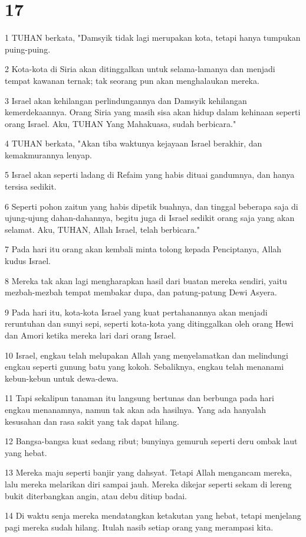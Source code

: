 \chapter{17}

\par 1 TUHAN berkata, "Damsyik tidak lagi merupakan kota, tetapi hanya tumpukan puing-puing.
\par 2 Kota-kota di Siria akan ditinggalkan untuk selama-lamanya dan menjadi tempat kawanan ternak; tak seorang pun akan menghalaukan mereka.
\par 3 Israel akan kehilangan perlindungannya dan Damsyik kehilangan kemerdekaannya. Orang Siria yang masih sisa akan hidup dalam kehinaan seperti orang Israel. Aku, TUHAN Yang Mahakuasa, sudah berbicara."
\par 4 TUHAN berkata, "Akan tiba waktunya kejayaan Israel berakhir, dan kemakmurannya lenyap.
\par 5 Israel akan seperti ladang di Refaim yang habis dituai gandumnya, dan hanya tersisa sedikit.
\par 6 Seperti pohon zaitun yang habis dipetik buahnya, dan tinggal beberapa saja di ujung-ujung dahan-dahannya, begitu juga di Israel sedikit orang saja yang akan selamat. Aku, TUHAN, Allah Israel, telah berbicara."
\par 7 Pada hari itu orang akan kembali minta tolong kepada Penciptanya, Allah kudus Israel.
\par 8 Mereka tak akan lagi mengharapkan hasil dari buatan mereka sendiri, yaitu mezbah-mezbah tempat membakar dupa, dan patung-patung Dewi Asyera.
\par 9 Pada hari itu, kota-kota Israel yang kuat pertahanannya akan menjadi reruntuhan dan sunyi sepi, seperti kota-kota yang ditinggalkan oleh orang Hewi dan Amori ketika mereka lari dari orang Israel.
\par 10 Israel, engkau telah melupakan Allah yang menyelamatkan dan melindungi engkau seperti gunung batu yang kokoh. Sebaliknya, engkau telah menanami kebun-kebun untuk dewa-dewa.
\par 11 Tapi sekalipun tanaman itu langsung bertunas dan berbunga pada hari engkau menanamnya, namun tak akan ada hasilnya. Yang ada hanyalah kesusahan dan rasa sakit yang tak dapat hilang.
\par 12 Bangsa-bangsa kuat sedang ribut; bunyinya gemuruh seperti deru ombak laut yang hebat.
\par 13 Mereka maju seperti banjir yang dahsyat. Tetapi Allah mengancam mereka, lalu mereka melarikan diri sampai jauh. Mereka dikejar seperti sekam di lereng bukit diterbangkan angin, atau debu ditiup badai.
\par 14 Di waktu senja mereka mendatangkan ketakutan yang hebat, tetapi menjelang pagi mereka sudah hilang. Itulah nasib setiap orang yang merampasi kita.

